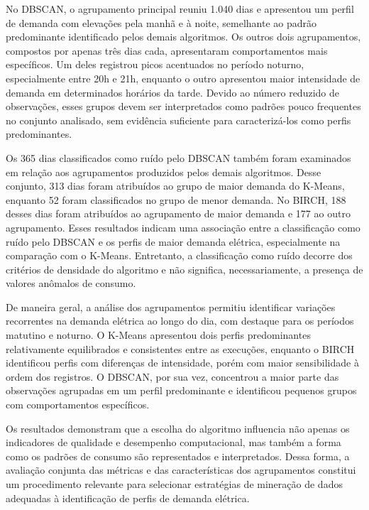 \documentclass[lettersize,journal]{IEEEtran}
\begin{document}
No DBSCAN, o agrupamento principal reuniu 1.040 dias e apresentou um perfil de demanda com elevações pela manhã e à noite, semelhante ao padrão predominante identificado pelos demais algoritmos. Os outros dois agrupamentos, compostos por apenas três dias cada, apresentaram comportamentos mais específicos. Um deles registrou picos acentuados no período noturno, especialmente entre 20h e 21h, enquanto o outro apresentou maior intensidade de demanda em determinados horários da tarde. Devido ao número reduzido de observações, esses grupos devem ser interpretados como padrões pouco frequentes no conjunto analisado, sem evidência suficiente para caracterizá-los como perfis predominantes.

Os 365 dias classificados como ruído pelo DBSCAN também foram examinados em relação aos agrupamentos produzidos pelos demais algoritmos. Desse conjunto, 313 dias foram atribuídos ao grupo de maior demanda do K-Means, enquanto 52 foram classificados no grupo de menor demanda. No BIRCH, 188 desses dias foram atribuídos ao agrupamento de maior demanda e 177 ao outro agrupamento. Esses resultados indicam uma associação entre a classificação como ruído pelo DBSCAN e os perfis de maior demanda elétrica, especialmente na comparação com o K-Means. Entretanto, a classificação como ruído decorre dos critérios de densidade do algoritmo e não significa, necessariamente, a presença de valores anômalos de consumo.

De maneira geral, a análise dos agrupamentos permitiu identificar variações recorrentes na demanda elétrica ao longo do dia, com destaque para os períodos matutino e noturno. O K-Means apresentou dois perfis predominantes relativamente equilibrados e consistentes entre as execuções, enquanto o BIRCH identificou perfis com diferenças de intensidade, porém com maior sensibilidade à ordem dos registros. O DBSCAN, por sua vez, concentrou a maior parte das observações agrupadas em um perfil predominante e identificou pequenos grupos com comportamentos específicos.

Os resultados demonstram que a escolha do algoritmo influencia não apenas os indicadores de qualidade e desempenho computacional, mas também a forma como os padrões de consumo são representados e interpretados. Dessa forma, a avaliação conjunta das métricas e das características dos agrupamentos constitui um procedimento relevante para selecionar estratégias de mineração de dados adequadas à identificação de perfis de demanda elétrica.
\end{document}
